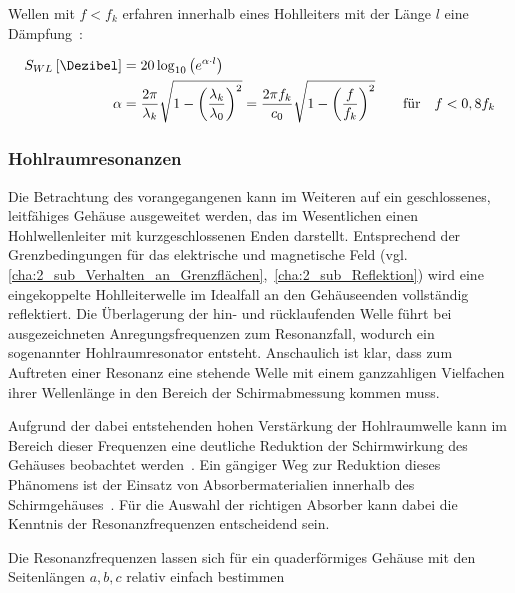 \par
\vspace{\linespace}
Wellen mit $f < f_k$ erfahren innerhalb eines Hohlleiters mit der Länge $l$ eine Dämpfung~\cite{EM_Schirmung}:

\begin{align}
    S_{WL} \left[\si{\Dezibel}\right] &= 20\log_{10}\left(e^{\alpha\cdot l}\right)  \\
    \alpha &= \frac{2\pi}{\lambda_k} \sqrt{1-\left(\frac{\lambda_k}{\lambda_0}\right)^2} = \frac{2\pi f_k}{c_0} \sqrt{1-\left(\frac{f}{f_k}\right)^2} \qquad \text{für} \quad f < 0,8 f_k
\end{align}




\subsubsection{Hohlraumresonanzen}\label{cha:2_subsub_Hohlraumresonanzen}

Die Betrachtung des vorangegangenen \Abschnitts{} kann im Weiteren auf ein geschlossenes, leitfähiges Gehäuse ausgeweitet werden, das im Wesentlichen einen Hohlwellenleiter mit kurzgeschlossenen Enden darstellt. Entsprechend der Grenzbedingungen für das elektrische und magnetische Feld (vgl. \Abschnitte\ref{cha:2_sub_Verhalten_an_Grenzflächen},~\ref{cha:2_sub_Reflektion}) wird eine eingekoppelte Hohlleiterwelle im Idealfall an den Gehäuseenden vollständig reflektiert. Die Überlagerung der hin- und rücklaufenden Welle führt bei ausgezeichneten Anregungsfrequenzen zum Resonanzfall, wodurch ein sogenannter Hohlraumresonator entsteht. Anschaulich ist klar, dass zum Auftreten einer Resonanz eine stehende Welle mit einem ganzzahligen Vielfachen ihrer Wellenlänge in den Bereich der Schirmabmessung kommen muss.
\par
\vspace{\linespace}
Aufgrund der dabei entstehenden hohen Verstärkung der Hohlraumwelle kann im Bereich dieser Frequenzen eine deutliche Reduktion der Schirmwirkung des Gehäuses beobachtet werden~\cite{EM_Schirmung}. Ein gängiger Weg zur Reduktion dieses Phänomens ist der Einsatz von Absorbermaterialien innerhalb des Schirmgehäuses~\cite{EM_Schirmung}. Für die Auswahl der richtigen Absorber kann dabei die Kenntnis der Resonanzfrequenzen entscheidend sein. 
\par
\vspace{\linespace}
Die Resonanzfrequenzen lassen sich für ein quaderförmiges Gehäuse mit den Seitenlängen $a, b, c$ relativ einfach bestimmen~\cite{Klassische_Elektrodynamik}

